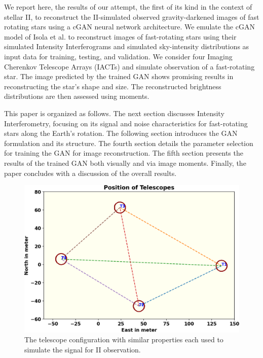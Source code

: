 We report here, the results of our attempt, the first of its kind in the context of stellar II, to reconstruct the II-simulated observed gravity-darkened images of fast rotating stars using a cGAN neural network architecture. We emulate the cGAN model of Isola et al. \cite{isola2017image} to reconstruct images of fast-rotating stars using their simulated Intensity Interferograms and simulated sky-intensity distributions as input data for training, testing, and validation. We consider four Imaging Cherenkov Telescope Arrays (IACTs) and simulate observation of a fast-rotating star. The image predicted by the trained GAN shows promising results in reconstructing the star’s shape and size. The reconstructed brightness distributions are then assessed using moments.

This paper is organized as follows. The next section discusses Intensity Interferometry, focusing on its signal and noise characteristics for fast-rotating stars along the Earth’s rotation. The following section introduces the GAN formulation and its structure. The fourth section details the parameter selection for training the GAN for image reconstruction. The fifth section presents the results of the trained GAN both visually and via image moments. Finally, the paper concludes with a discussion of the overall results.
\begin{figure}
	\centering
	\includegraphics[width=\linewidth]{fig/telescope.png}
	\caption{The telescope configuration with similar properties each used to simulate the signal for II observation.}
	\label{fig:teles}
\end{figure}